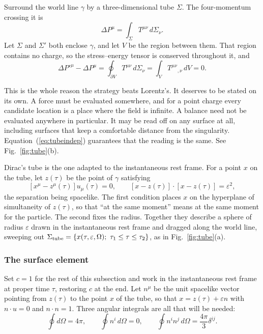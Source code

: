 \documentclass[preprint]{aastex701}
\begin{document}
Surround the world line $\gamma$ by a three-dimensional tube $\Sigma$. The
four-momentum crossing it is
\begin{equation}
\Delta P^\mu = \int_\Sigma T^{\mu\nu}\,d\Sigma_\nu .
\label{eq:tubeflux}
\end{equation}
Let $\Sigma$ and $\Sigma'$ both enclose $\gamma$, and let $V$ be the region
between them. That region contains no charge, so the stress--energy tensor is
conserved throughout it, and
\begin{equation}
\Delta P'^\mu - \Delta P^\mu
= \oint_{\partial V} T^{\mu\nu}\,d\Sigma_\nu
= \int_V T^{\mu\nu}{}_{,\nu}\,dV = 0 .
\label{eq:tubeindep}
\end{equation}

This is the whole reason the strategy beats Lorentz's. It deserves to be stated
on its own. A force must be evaluated somewhere, and for a point charge every
candidate location is a place where the field is infinite. A balance need not be
evaluated anywhere in particular. It may be read off on any surface at all,
including surfaces that keep a comfortable distance from the singularity.
Equation~(\ref{eq:tubeindep}) guarantees that the reading is the same. See
Fig.~\ref{fig:tube}(b).

Dirac's tube is the one adapted to the instantaneous rest frame. For a point $x$
on the tube, let $z(\tau)$ be the point of $\gamma$ satisfying
\begin{equation}
\left[x^\mu - z^\mu(\tau)\right]u_\mu(\tau) = 0 ,
\qquad
\left[x - z(\tau)\right]\cdot\left[x - z(\tau)\right] = \varepsilon^2 ,
\label{eq:diractube}
\end{equation}
the separation being spacelike. The first condition places $x$ on the hyperplane
of simultaneity of $z(\tau)$, so that ``at the same moment'' means at the same
moment for the particle. The second fixes the radius. Together they describe a
sphere of radius $\varepsilon$ drawn in the instantaneous rest frame and dragged
along the world line, sweeping out
$\Sigma_{\rm tube} = \{x(\tau,\varepsilon,\Omega);\ \tau_1\le\tau\le\tau_2\}$,
as in Fig.~\ref{fig:tube}(a).

\subsubsection{The surface element}
\label{sec:element}

Set $c=1$ for the rest of this subsection and work in the instantaneous rest
frame at proper time $\tau$, restoring $c$ at the end. Let $n^\mu$ be the unit
spacelike vector pointing from $z(\tau)$ to the point $x$ of the tube, so that
$x = z(\tau) + \varepsilon n$ with $n\cdot u = 0$ and $n\cdot n = 1$. Three
angular integrals are all that will be needed:
\begin{equation}
\oint d\Omega = 4\pi, \qquad
\oint n^i\,d\Omega = 0, \qquad
\oint n^i n^j\,d\Omega = \frac{4\pi}{3}\delta^{ij}.
\label{eq:angint}
\end{equation}
\end{document}

